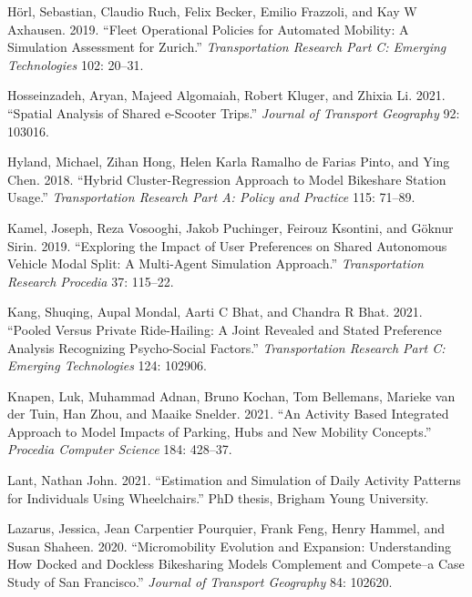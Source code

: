 \documentclass[12pt, oneside, openright]{byuthesis}
\newlength{\cslhangindent}
\newlength{\cslentryspacingunit} %
\newenvironment{CSLReferences}[2] %
 {%
  \setlength{\parindent}{0pt}
  \ifodd #1
  \let\oldpar\par
  \def\par{\hangindent=\cslhangindent\oldpar}
  \fi
  \setlength{\parskip}{#2\cslentryspacingunit}
 }%
 {}
\begin{document}
\begin{CSLReferences}{1}{0}
\leavevmode{}%
Hörl, Sebastian, Claudio Ruch, Felix Becker, Emilio Frazzoli, and Kay W Axhausen. 2019. {``Fleet Operational Policies for Automated Mobility: A Simulation Assessment for Zurich.''} \emph{Transportation Research Part C: Emerging Technologies} 102: 20--31.

\leavevmode{}%
Hosseinzadeh, Aryan, Majeed Algomaiah, Robert Kluger, and Zhixia Li. 2021. {``Spatial Analysis of Shared e-Scooter Trips.''} \emph{Journal of Transport Geography} 92: 103016.

\leavevmode{}%
Hyland, Michael, Zihan Hong, Helen Karla Ramalho de Farias Pinto, and Ying Chen. 2018. {``Hybrid Cluster-Regression Approach to Model Bikeshare Station Usage.''} \emph{Transportation Research Part A: Policy and Practice} 115: 71--89.

\leavevmode{}%
Kamel, Joseph, Reza Vosooghi, Jakob Puchinger, Feirouz Ksontini, and Göknur Sirin. 2019. {``Exploring the Impact of User Preferences on Shared Autonomous Vehicle Modal Split: A Multi-Agent Simulation Approach.''} \emph{Transportation Research Procedia} 37: 115--22.

\leavevmode{}%
Kang, Shuqing, Aupal Mondal, Aarti C Bhat, and Chandra R Bhat. 2021. {``Pooled Versus Private Ride-Hailing: A Joint Revealed and Stated Preference Analysis Recognizing Psycho-Social Factors.''} \emph{Transportation Research Part C: Emerging Technologies} 124: 102906.

\leavevmode{}%
Knapen, Luk, Muhammad Adnan, Bruno Kochan, Tom Bellemans, Marieke van der Tuin, Han Zhou, and Maaike Snelder. 2021. {``An Activity Based Integrated Approach to Model Impacts of Parking, Hubs and New Mobility Concepts.''} \emph{Procedia Computer Science} 184: 428--37.

\leavevmode{}%
Lant, Nathan John. 2021. {``Estimation and Simulation of Daily Activity Patterns for Individuals Using Wheelchairs.''} PhD thesis, Brigham Young University.

\leavevmode{}%
Lazarus, Jessica, Jean Carpentier Pourquier, Frank Feng, Henry Hammel, and Susan Shaheen. 2020. {``Micromobility Evolution and Expansion: Understanding How Docked and Dockless Bikesharing Models Complement and Compete--a Case Study of San Francisco.''} \emph{Journal of Transport Geography} 84: 102620.


\end{CSLReferences}
\end{document}
